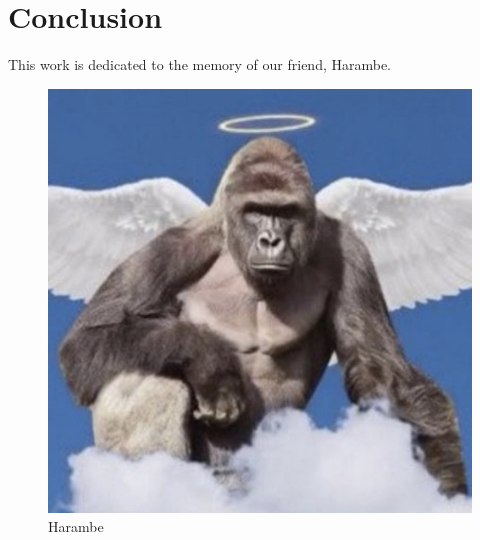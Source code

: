 \documentclass{article}
\begin{document}
\section{Conclusion}

This work is dedicated to the memory of our friend, Harambe. 

\begin{figure}[h!]
\centering
\includegraphics[scale=0.5]{harambe.jpg}
\caption{Harambe}
\label{fig:Harambe}
\end{figure}
\end{document}
